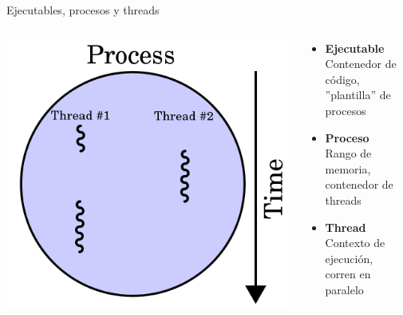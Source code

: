 \documentclass{beamer}
\begin{document}
\begin{frame}{Ejecutables, procesos y threads}

\begin{columns}

\begin{column}{.50\textwidth}
\begin{center}
\includegraphics[scale=0.35]{threads.png}
\end{center}
\end{column}

\begin{column}{.50\textwidth}
\begin{itemize}
\item \textbf{Ejecutable}\\ \hspace{4ex}Contenedor de código,\\\hspace{4ex}''plantilla'' de procesos
\item \textbf{Proceso}\\ \hspace{4ex}Rango de memoria,\\\hspace{4ex}contenedor de threads
\item \textbf{Thread}\\ \hspace{4ex}Contexto de ejecución,\\\hspace{4ex}corren en paralelo
\end{itemize}
\end{column}

\end{columns}

\end{frame}
\end{document}
